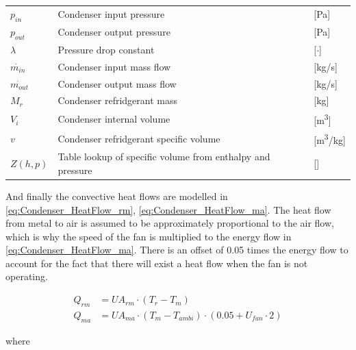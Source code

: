 \begin{center}
	\begin{tabular}{l p{8cm} l}
		$p_{in}$        & Condenser input pressure                                   & [\si{Pa}]          \\
		$p_{out}$       & Condenser output pressure                                  & [\si{Pa}]          \\
		$\lambda$       & Pressure drop constant                                     & [$\cdot$]          \\
		$\dot{m_{in}}$  & Condenser input mass flow                                  & [\si{kg}/\si{s}]   \\
		$\dot{m_{out}}$ & Condenser output mass flow                                 & [\si{kg}/\si{s}]   \\
		$M_{r}$         & Condenser refridgerant mass                                & [\si{kg}]          \\
		$V_{i}$         & Condenser internal volume                                  & [\si{m^3}]         \\
		$v$             & Condenser refridgerant specific volume                     & [\si{m^3}/\si{kg}] \\
		$Z(h,p)$        & Table lookup of specific volume from enthalpy and pressure & []
	\end{tabular}
\end{center}


And finally the convective heat flows are modelled in \cref{eq:Condenser_HeatFlow_rm}, \cref{eq:Condenser_HeatFlow_ma}. The heat flow from metal to air is assumed to be approximately proportional to the air flow, which is why the speed of the fan is multiplied to the energy flow in \cref{eq:Condenser_HeatFlow_ma}. There is an offset of 0.05 times the energy flow to account for the fact that there will exist a heat flow when the fan is not operating.

\begin{align}
	Q_{rm}	 			& = U A_{rm} \cdot (T_r - T_m)							\label{eq:Condenser_HeatFlow_rm}\\
	Q_{ma}	 			& = U A_{ma} \cdot (T_m - T_{ambi})\cdot (0.05 + U_{fan} \cdot 2)				\label{eq:Condenser_HeatFlow_ma}
\end{align}

where

